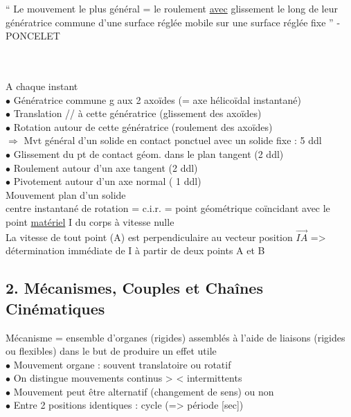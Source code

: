 \begin{orangebox}
“ Le mouvement le plus général = le roulement \underline{avec} glissement le long de leur {\color{orange}génératrice commune} d’une surface réglée mobile sur une surface réglée fixe ” - PONCELET
\end{orangebox}\\\\

A chaque instant\\
$\bullet$ {\color{orange}Génératrice commune} g aux 2 axoïdes (= axe hélicoïdal instantané)\\
$\bullet$ Translation // à cette génératrice ({\color{orange}glissement} des axoïdes)\\
$\bullet$ Rotation autour de cette génératrice ({\color{orange}roulemen}t des axoïdes)\\

$\Rightarrow$ Mvt général d’un solide en contact ponctuel avec un solide fixe : 5 ddl\\
$\bullet$ {\color{orange}Glissement} du pt de contact géom. dans le plan tangent (2 ddl)\\
$\bullet$ {\color{orange}Roulement} autour d’un axe tangent (2 ddl)\\
$\bullet$ {\color{orange}Pivotement} autour d’un axe normal ( 1 ddl)\\

Mouvement plan d’un solide\\
centre instantané de rotation = c.i.r. = point géométrique coïncidant avec le point \underline{matériel} I du corps à vitesse nulle\\
La vitesse de tout point (A) est perpendiculaire au vecteur position $\overrightarrow{IA}$ => détermination immédiate de I à partir de deux points A et B\\

\subsection*{2. Mécanismes, Couples et Chaînes Cinématiques}
{\color{orange}Mécanisme} = ensemble d’{\color{orange}organes} (rigides) assemblés à l’aide de {\color{orange}liaisons} (rigides ou flexibles) dans le but de produire un {\color{orange}effet utile}\\

\noindent$\bullet$ {\color{orange}Mouvement} organe : souvent translatoire ou rotatif\\
$\bullet$ On distingue mouvements {\color{orange}continus} {\color{red}> <} {\color{orange}intermittents}\\
$\bullet$ Mouvement peut être {\color{orange}alternatif} (changement de sens) ou non\\
$\bullet$ Entre 2 positions identiques : {\color{orange}cycle} (=> {\color{orange}période} [sec])\\

